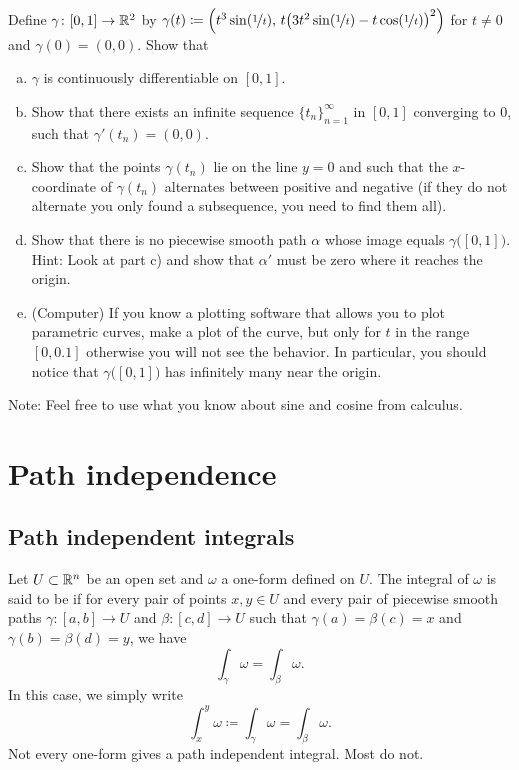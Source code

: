 \begin{exercise}
Define $\gamma \colon [0,1] \to {\mathbb{R}}^2$ by
$\gamma(t) \coloneqq \Bigl( t^3 \sin(\nicefrac{1}{t}),\,
t{\bigl(3t^2\sin(\nicefrac{1}{t})-t\cos(\nicefrac{1}{t})\bigr)}^2 \Bigr)$
for
$t \neq 0$ and $\gamma(0) = (0,0)$.  Show that
\begin{enumerate}[a)]
\item
$\gamma$ is continuously differentiable on $[0,1]$.
\item
Show that there exists an infinite sequence $\{ t_n \}_{n=1}^\infty$ in $[0,1]$
converging to 0, such that
$\gamma'(t_n) = (0,0)$.
\item
Show that the points $\gamma(t_n)$ lie on the line $y=0$ and such
that the $x$-coordinate of $\gamma(t_n)$ alternates between positive and
negative (if they do not alternate you only found a subsequence,
you need to find them all).
\item
Show that there is no piecewise smooth path $\alpha$ whose image equals
$\gamma\bigl([0,1]\bigr)$.  Hint: Look at part c) and show that $\alpha'$
must be zero where it reaches the origin.
\item
(Computer) If you know a plotting software that allows you to plot
parametric curves, make a plot of the curve, but only for $t$ in the
range $[0,0.1]$ otherwise you will not see the behavior.  In particular, you
should notice that $\gamma\bigl([0,1]\bigr)$ has infinitely many
near the origin.
\end{enumerate}
Note: Feel free to use what you know about sine and cosine from calculus.
\end{exercise}


\sectionnewpage
\section{Path independence}
\label{sec:pathind}



\subsection{Path independent integrals}

Let $U \subset {\mathbb{R}}^n$ be an open set and $\omega$ a one-form defined on $U$.
The integral of $\omega$
is said to be \emph{}
if for every pair of points $x,y \in U$ and
every pair of piecewise smooth paths
$\gamma \colon [a,b] \to U$ and
$\beta \colon [c,d] \to U$ such that $\gamma(a) = \beta(c) = x$
and $\gamma(b) = \beta(d) = y$, we have
\begin{equation*}
\int_\gamma \omega = \int_\beta \omega .
\end{equation*}
In this case, we simply write
\begin{equation*}
\int_x^y \omega \coloneqq \int_\gamma \omega = \int_\beta \omega .
\end{equation*}
Not every one-form gives a path independent integral.  Most do not.


